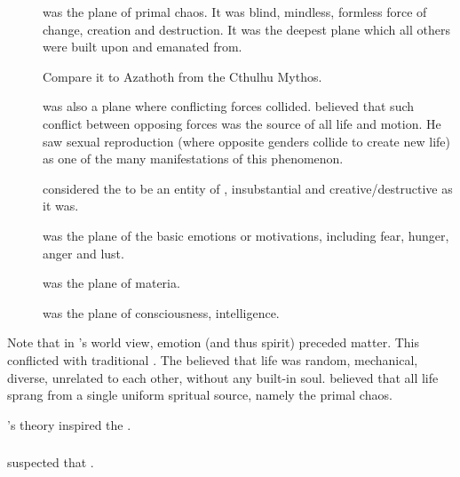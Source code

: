 \begin{description}
  \item[\DaathKurZulNathla] was the plane of primal chaos. 
    It was blind, mindless, formless force of change, creation and destruction.
    It was the deepest plane which all others were built upon and emanated from. 
    
    Compare it to Azathoth from the Cthulhu Mythos. 
    
    \DaathKurZulNathla was also a plane where conflicting forces collided.
    \Sethicus believed that such conflict between opposing forces was the source of all life and motion.
    He saw sexual reproduction (where opposite genders collide to create new life) as one of the many manifestations of this phenomenon. 
    
    \Sethicus considered the \noggyal {} to be an entity of \DaathKurZulNathla, insubstantial and creative/destructive as it was. 
  
  \item[\Osserylloch] was the plane of the basic emotions or motivations, including fear, hunger, anger and lust. 
    
  \item[\Barbeloth] was the plane of materia. 
  
  \item[\YothUnXachtyon] was the plane of consciousness, intelligence. 
\end{description}

Note that in \Sethicus's world view, emotion (and thus spirit) preceded matter. 
This conflicted with traditional . 
The \ophidians believed that life was random, mechanical, diverse, unrelated to each other, without any built-in soul. 
\Sethicus believed that all life sprang from a single uniform spritual source, namely the primal chaos. 

\Sethicus's theory inspired the .






\subsubsection{\Ophidians}
\Sethicus suspected that . 





